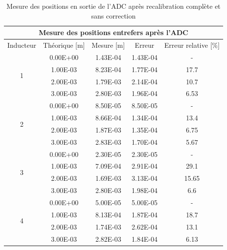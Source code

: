 \begin{table}[H]
    \centering
    \begin{tabular}{|c|c|c|c|c|}
        \hline
        \multicolumn{5}{|c|}{\textbf{Mesure des positions entrefers après l'ADC}}                     \\ \hline
        Inducteur          & Théorique {[}m{]} & Mesure {[}m{]} & Erreur   & Erreur relative {[}\%{]} \\ \hline
        \multirow{4}{*}{1} & 0.00E+00          & 1.43E-04       & 1.43E-04 & -                        \\ \cline{2-5}
                           & 1.00E-03          & 8.23E-04       & 1.77E-04 & 17.7                     \\ \cline{2-5}
                           & 2.00E-03          & 1.79E-03       & 2.14E-04 & 10.7                     \\ \cline{2-5}
                           & 3.00E-03          & 2.80E-03       & 1.96E-04 & 6.53                     \\ \hline
        \multirow{4}{*}{2} & 0.00E+00          & 8.50E-05       & 8.50E-05 & -                        \\ \cline{2-5}
                           & 1.00E-03          & 8.66E-04       & 1.34E-04 & 13.4                     \\ \cline{2-5}
                           & 2.00E-03          & 1.87E-03       & 1.35E-04 & 6.75                     \\ \cline{2-5}
                           & 3.00E-03          & 2.83E-03       & 1.70E-04 & 5.67                     \\ \hline
        \multirow{4}{*}{3} & 0.00E+00          & 2.30E-05       & 2.30E-05 & -                        \\ \cline{2-5}
                           & 1.00E-03          & 7.09E-04       & 2.91E-04 & 29.1                     \\ \cline{2-5}
                           & 2.00E-03          & 1.69E-03       & 3.13E-04 & 15.65                    \\ \cline{2-5}
                           & 3.00E-03          & 2.80E-03       & 1.98E-04 & 6.6                      \\ \hline
        \multirow{4}{*}{4} & 0.00E+00          & 5.00E-05       & 5.00E-05 & -                        \\ \cline{2-5}
                           & 1.00E-03          & 8.13E-04       & 1.87E-04 & 18.7                     \\ \cline{2-5}
                           & 2.00E-03          & 1.74E-03       & 2.62E-04 & 13.1                     \\ \cline{2-5}
                           & 3.00E-03          & 2.82E-03       & 1.84E-04 & 6.13                     \\ \hline
    \end{tabular}
    \caption{Mesure des positions en sortie de l'ADC après recalibration complète et sans correction}
    \label{tab:recalib_sans_correction_adc}
\end{table}

